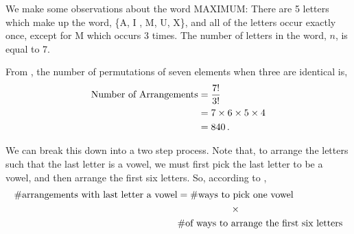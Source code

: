 %
%


\begin{subquestions}
	
\subquestion

We make some observations about the word MAXIMUM: There are 5 letters which make up the word, \{A, I , M, U, X\}, and all of the letters occur exactly once, except for M which occurs 3 times. The number of letters in the word, $n$, is equal to 7.
	
\begin{subsubquestions}
	
\subsubquestion

From , the number of permutations of seven elements when three are identical is,
\begin{align}
	\text{Number of Arrangements} & = \frac{7!}{3!} \nonumber \\
	                              & = 7 \times 6 \times 5 \times 4 \nonumber \\
	                              & = 840 \,.
\end{align}


\subsubquestion

We can break this down into a two step process. Note that, to arrange the letters such that the last letter is a vowel, we must first pick the last letter to be a vowel, and then arrange the first six letters. So, according to ,
\begin{align}
	\# \text{arrangements with last letter a vowel} &= \# \text{ways to pick one vowel} \nn \\
	& \hspace{20mm}\times \nn\\
	&\# \text{of ways to arrange the first six letters}
\end{align}


\end{subsubquestions}
\end{subquestions}
